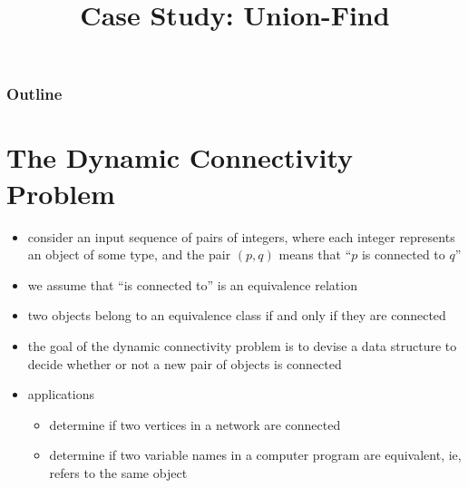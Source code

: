 \documentclass[8pt,a4paper,compress]{beamer}
\title{Case Study: Union-Find}
\date{}
\begin{document}
\begin{frame}
\vfill
\titlepage
\end{frame}

\begin{frame}
\frametitle{Outline}
\tableofcontents
\end{frame}

\section{The Dynamic Connectivity Problem}
\begin{frame}[fragile]
\begin{minipage}{250pt}
\begin{itemize}
\item consider an input sequence of pairs of integers, where each integer represents an object of some type, and the pair $(p, q)$ means that ``$p$ is connected to $q$''

\item we assume that ``is connected to'' is an equivalence relation

\item two objects belong to an equivalence class if and only if they are connected

\item the goal of the dynamic connectivity problem is to devise a data structure to decide whether or not a new pair of objects is connected 

\item applications
\begin{itemize}
\item determine if two vertices in a network are connected

\item determine if two variable names in a computer program are equivalent, ie, refers to the same object


\end{itemize}
\end{itemize}
\end{minipage}
\end{frame}
\end{document}
